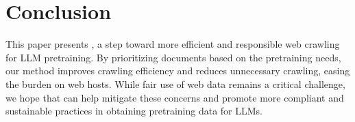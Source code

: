 \section{Conclusion}


This paper presents \ours{}, a step toward more efficient and responsible web crawling for LLM pretraining. 
By prioritizing documents based on the pretraining needs, our method improves crawling efficiency and reduces unnecessary crawling, easing the burden on web hosts.
While fair use of web data remains a critical challenge, we hope that \ours{} can help mitigate these concerns and promote more compliant and sustainable practices in obtaining pretraining data for LLMs.  



